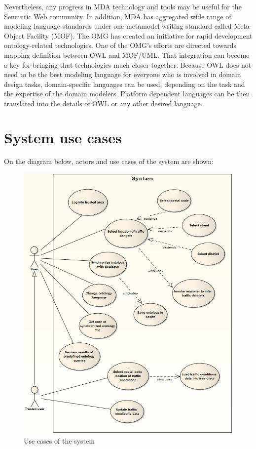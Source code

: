 Nevertheless, any progress in MDA technology and tools may be useful for the Semantic Web community. In addition, MDA has aggregated wide range of modeling language standards under one metamodel writing standard called Meta-Object Facility (MOF). The OMG has created an initiative for rapid development ontology-related technologies. One of the OMG's efforts are directed towards mapping definition between OWL and MOF/UML. That integration can become a key for bringing that technologies much closer together. Because OWL does not need to be the best modeling language for everyone who is involved in domain design tasks, domain-specific languages can be used, depending on the task and
the expertise of the domain modelers. Platform dependent languages can be then translated into the details of OWL or any other desired language.

\newpage

\section{System use cases}
\label{sec:systemUseCases}

On the diagram below, actors and use cases of the system are shown:

\medskip

\begin{figure}[htp]
\centering
\includegraphics[scale=0.58]{images/chapter4/UseCase}
\caption{Use cases of the system}
\label{fig:useCases}
\end{figure}


